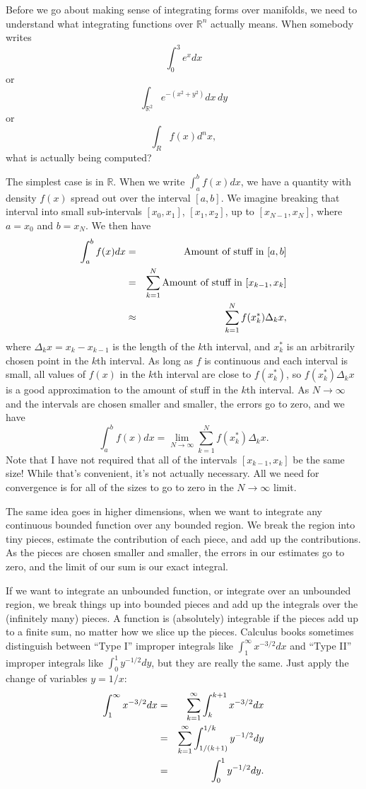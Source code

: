 \documentclass[12pt]{amsbook}
\newcommand{\R}{{\mathbb R}}
\theoremstyle{definition}
\begin{document}
Before we go about making sense of integrating forms over manifolds, we 
need to understand what integrating functions over $\R^n$ actually means. 
When somebody writes
$$\int_0^3 e^x dx$$
or 
$$ \int_{\R^2} e^{-(x^2+y^2)} dx\, dy$$
or
$$ \int_R f(x) d^nx,$$
what is actually being computed? 

The simplest case is in $\R$. When we write $\int_a^b f(x) dx$, we have a 
quantity with density $f(x)$ spread out over the interval $[a,b]$. We imagine
breaking that interval into small sub-intervals $[x_0,x_1]$, $[x_1,x_2]$, up to
$[x_{N-1},x_N]$, where $a=x_0$ and $b=x_N$. We then have 
\begin{eqnarray}
\int_a^b f(x) dx & = & \hbox{Amount of stuff in $[a,b]$} \cr 
& = & \sum_{k=1}^N \hbox{Amount of stuff in $[x_{k-1},x_k]$} \cr 
& \approx & \sum_{k=1}^N f(x_k^*) \Delta_k x,
\end{eqnarray}
where $\Delta_k x = x_k-x_{k-1}$ is the length of the $k$th interval, and 
$x_k^*$ is an arbitrarily chosen point in the $k$th interval. As long as 
$f$ is continuous and each interval is small, all values of $f(x)$ in the 
$k$th interval are close to $f(x_k^*)$, so $f(x_k^*) \Delta_k x$ is a good
approximation to the amount of stuff in the $k$th interval. As 
$N \to \infty$ and the intervals are chosen smaller and smaller, the errors
go to zero, and we have 
$$\int_a^b f(x) dx = \lim_{N \to \infty} \sum_{k=1}^N f(x_k^*) \Delta_k x.$$
Note that I have not required that all of the intervals $[x_{k-1},x_k]$ be
the same size! While that's convenient, it's not actually necessary. 
All we need for convergence is for all of the sizes to go to zero
in the $N \to \infty$ limit. 

The same idea goes in higher dimensions, when we want to integrate 
any continuous bounded function over any 
bounded region. We break the region into tiny pieces,
estimate the contribution of each piece, and add up the contributions.
As the pieces are chosen smaller and smaller, the errors in our estimates
go to zero, and the limit of our sum is our exact integral. 

If we want to integrate an unbounded function, or integrate over an
unbounded region, we break things up into bounded pieces and add up
the integrals over the (infinitely many) pieces.  
A function is (absolutely) integrable if
the pieces add up to a finite sum, no matter how we slice up the
pieces. Calculus books sometimes distinguish between ``Type I'' improper 
integrals
like $\int_1^\infty x^{-3/2} dx$ and ``Type II'' improper integrals like
$\int_0^1 y^{-1/2} dy$, but they are really the same. Just apply the 
change of variables $y=1/x$:  
\begin{eqnarray}
\int_1^\infty x^{-3/2} dx & = & \sum_{k=1}^\infty \int_k^{k+1} x^{-3/2} dx \cr 
& = & \sum_{k=1}^\infty \int_{1/(k+1)}^{1/k} y^{-1/2} dy \cr 
&=& \int_0^1 y^{-1/2} dy.
\end{eqnarray}
\end{document}
